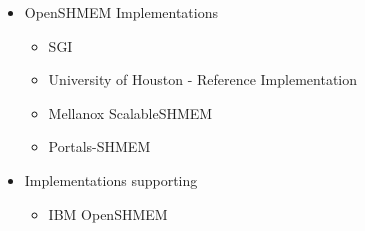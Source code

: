 \begin{itemize}
\begin{itemize}
  \end{itemize}
\item OpenSHMEM Implementations 
 \begin{itemize}
  \item SGI \openshmem
  \item University of Houston - \openshmem Reference Implementation
  \item Mellanox ScalableSHMEM
  \item Portals-SHMEM
  \end{itemize} 
  \item Implementations supporting \openshmem 
 \begin{itemize}
  \item IBM OpenSHMEM
  \end{itemize}
\end{itemize}



